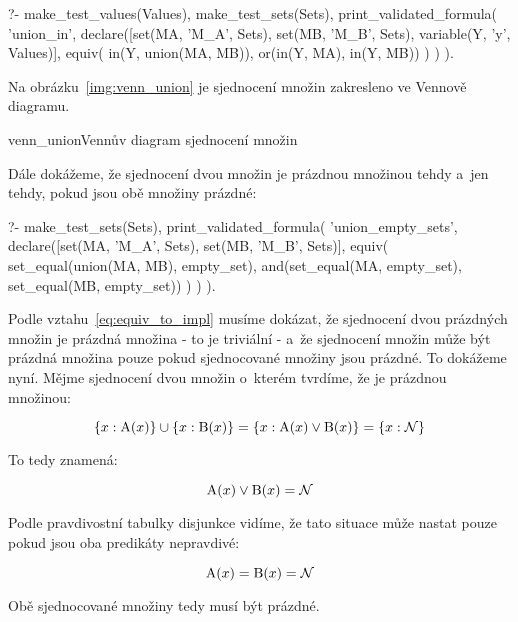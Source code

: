 \begin{prolog}
?- 	make_test_values(Values),
	make_test_sets(Sets),
	print_validated_formula(
		'union_in',
		declare([set(MA, 'M_A', Sets), set(MB, 'M_B', Sets), variable(Y, 'y', Values)],
			equiv(
				in(Y, union(MA, MB)),
				or(in(Y, MA), in(Y, MB))
			)
		)
	).
\end{prolog}

Na obrázku~\ref{img:venn_union} je sjednocení množin zakresleno ve Vennově diagramu.

\begin{fig}{venn_union}{Vennův diagram sjednocení množin}
\end{fig}

Dále dokážeme, že sjednocení dvou množin je prázdnou množinou tehdy a~jen tehdy, pokud jsou obě množiny prázdné:
\begin{prolog}
?-	make_test_sets(Sets),
	print_validated_formula(
		'union_empty_sets',
		declare([set(MA, 'M_A', Sets), set(MB, 'M_B', Sets)], 
			equiv(
				set_equal(union(MA, MB), empty_set),
				and(set_equal(MA, empty_set), set_equal(MB, empty_set))
			)
		)
	).
\end{prolog}

Podle vztahu~\eqref{eq:equiv_to_impl} musíme dokázat, že sjednocení dvou prázdných množin je prázdná množina - to je triviální - a~že sjednocení množin může být prázdná množina pouze pokud sjednocované množiny jsou prázdné. To dokážeme nyní. Mějme sjednocení dvou množin o~kterém tvrdíme, že je prázdnou množinou:

\begin{equation}
\{x: \mathrm{A}(x)\} \cup \{x: \mathrm{B}(x)\} = \{x: \mathrm{A}(x) \lor \mathrm{B}(x)\} = \{x: \mathcal{N}\}
\end{equation}

To tedy znamená:

\begin{equation}
\mathrm{A}(x) \lor \mathrm{B}(x) = \mathcal{N}
\end{equation}

Podle pravdivostní tabulky disjunkce vidíme, že tato situace může nastat pouze pokud jsou oba predikáty nepravdivé:

\begin{equation}
\mathrm{A}(x) = \mathrm{B}(x) = \mathcal{N}
\end{equation}

Obě sjednocované množiny tedy musí být prázdné.

